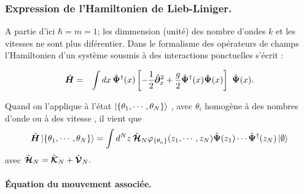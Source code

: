 \subsubsection{Expression de l’Hamiltonien de Lieb-Liniger. }
A partie d'ici $\hbar = m = 1 $; les dimmension (unité) des nombre d'ondes $k$ et les vitesses ne sont plus diférentier.
Dans le formalisme des opérateurs de  champs l’Hamiltonien d'un système sousmis à des interactions ponctuelles  s’écrit   :



\begin{eqnarray}
	\operator{H} & = & \int dx \, \operator{\Psi}^\dag (x)\left [-\frac{1}{2}\operator{\partial}_x^2 + \frac{g}{2}  \operator{\Psi}^\dag (x) \operator{\Psi} (x) \right ] \operator{\Psi} (x) \label{chap:1:ham.mod}.
\end{eqnarray}

Quand on l'applique à l'état $\ket{\{\theta_1 , \cdots , \theta_N \}} $, avec $\theta_i$ homogène à des nombres d'onde ou à des vitesse , il vient que %
\begin{eqnarray}
\hat{\bm{H}}\ket{\{\theta_1 , \cdots , \theta_N\}} =  \int d^Nz \, \hat{\bm{\mathcal{H}}}_N \varphi_{\{\theta_a\}}(z_1 , \cdots , z_N )\hat{\bm{\Psi}}(z_1)\cdots \hat{\bm{\Psi}}^\dag(z_N) \ket{\emptyset} 
\end{eqnarray}
avec 
\(
	\hat{\bm{\mathcal{H}}}_N 	
 =  \hat{\bm{\mathcal{K}}}_N  +  \hat{\bm{\mathcal{V}}}_N .	
\)




\paragraph{Équation du mouvement associée.}

